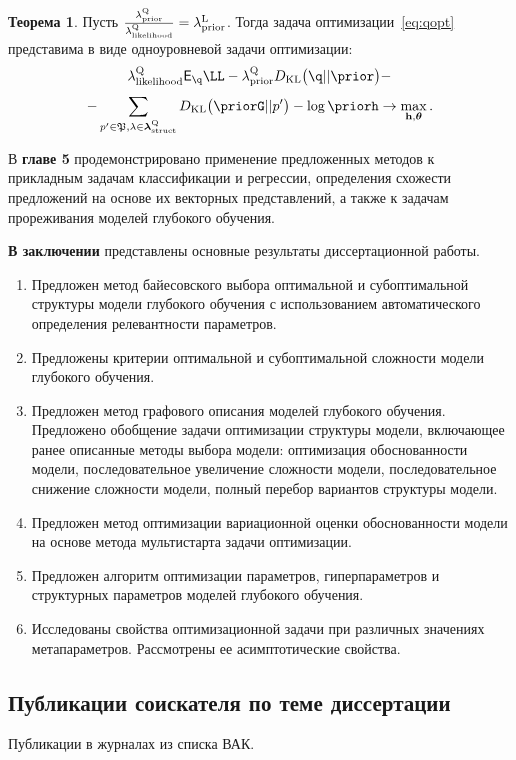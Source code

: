 \documentclass[11pt, a5paper]{dissert}
\theoremstyle{definition}
\newtheorem{theorem}{Теорема}
\begin{document}
{\begin{theorem}
\label{theorem:onelvl}
Пусть $\frac{\lambda_\text{prior}^\text{Q}}{\lambda_\text{likelihood}^\text{Q}} = \lambda_\text{prior}^\text{L}$. 
Тогда задача оптимизации~\eqref{eq:qopt} представима в виде одноуровневой задачи оптимизации:
\[
\lamLL \E_{\q}\LL - \lamCQ \KL{\q}{\prior} -
\]
\[
-\sum_{p' \in \mathfrak{P}, \lambda \in \lamS} \KL{\priorG}{p'} - \log \priorh \to \max_{\h, \teta}. 
\]
\end{theorem}


В \textbf{главе 5} продемонстрировано применение предложенных методов к прикладным задачам классификации и регрессии, определения схожести предложений на основе их векторных представлений, а также к задачам прореживания моделей глубокого обучения.

\vspace{0.5cm}
\textbf{В заключении} представлены основные результаты диссертационной работы.

\begin{enumerate}
\item Предложен метод байесовского выбора оптимальной и субоптимальной структуры модели глубокого обучения с использованием автоматического определения релевантности параметров.
\item Предложены критерии оптимальной и субоптимальной сложности модели глубокого обучения.
\item Предложен метод графового описания моделей глубокого обучения.
Предложено обобщение задачи оптимизации структуры модели, включающее ранее описанные методы выбора модели: оптимизация обоснованности модели, последовательное увеличение сложности модели, последовательное снижение сложности модели, полный перебор вариантов структуры модели.
\item Предложен метод оптимизации вариационной оценки обоснованности модели на основе метода мультистарта задачи оптимизации.
\item Предложен алгоритм оптимизации параметров, гиперпараметров и структурных параметров моделей глубокого обучения.
\item Исследованы свойства оптимизационной задачи при различных значениях метапараметров. Рассмотрены ее асимптотические свойства.

\end{enumerate}

\subsection*{Публикации соискателя по теме диссертации}
Публикации в журналах из списка ВАК.
\vspace{0.3cm}

}
\end{document}
